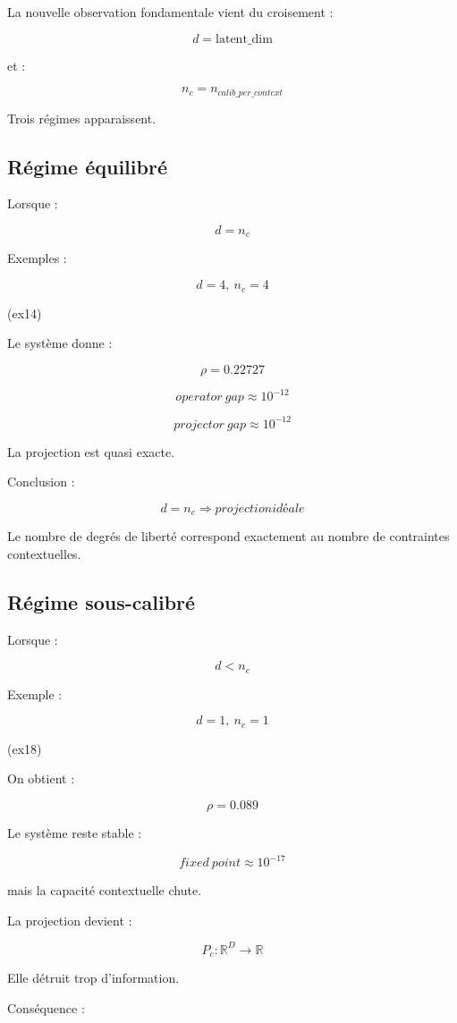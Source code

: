 \documentclass{article}
\begin{document}
La nouvelle observation fondamentale vient du croisement :

\[
d = \text{latent\_dim}
\]

et :

\[
n_c=n_{calib\_per\_context}
\]


Trois régimes apparaissent.


\subsection{Régime équilibré}

Lorsque :

\[
d=n_c
\]


Exemples :

\[
d=4,\ n_c=4
\]

(ex14)


Le système donne :

\[
\rho=0.22727
\]

\[
operator\ gap\approx10^{-12}
\]

\[
projector\ gap\approx10^{-12}
\]


La projection est quasi exacte.


Conclusion :

\[
\boxed{
d=n_c
\Rightarrow
projection idéale
}
\]


Le nombre de degrés de liberté correspond exactement
au nombre de contraintes contextuelles.


\subsection{Régime sous-calibré}

Lorsque :

\[
d<n_c
\]


Exemple :

\[
d=1,\ n_c=1
\]


(ex18)


On obtient :

\[
\rho=0.089
\]


Le système reste stable :

\[
fixed\ point\approx10^{-17}
\]


mais la capacité contextuelle chute.


La projection devient :

\[
P_c:\mathbb{R}^D\rightarrow\mathbb{R}
\]


Elle détruit trop d'information.


Conséquence :
\end{document}
